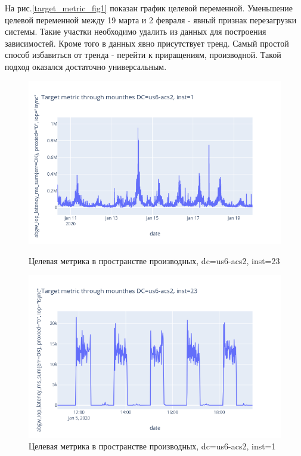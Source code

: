 \documentclass[14pt, a4paper]{extarticle}
\begin{document}
	На рис.\ref{target_metric_fig1} показан график целевой переменной. 
	Уменьшение целевой переменной между 19 марта и 2 февраля - явный признак перезагрузки системы. 
	Такие участки необходимо удалить из данных для построения зависимостей.
	Кроме того в данных явно присутствует тренд. 
	Самый простой способ избавиться от тренда - перейти к приращениям, производной. 
	Такой подход оказался достаточно универсальным.  
	\begin{figure}[!htb]
		\includegraphics[width=\linewidth]{Figures/target_der_1.png}
		\caption{Целевая метрика в пространстве производных, dc=us6-acs2, inst=23}\label{fig:target_der_fig1}
		\endminipage\hfill
		\includegraphics[width=\linewidth]{Figures/target_der_2.png}
		\caption{Целевая метрика в пространстве производных, dc=us6-acs2, inst=1}\label{fig:target_der_fig2}
		\endminipage
	\end{figure}
\end{document}
